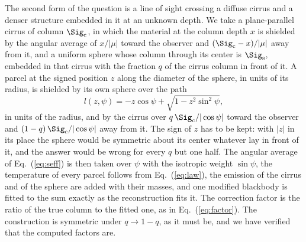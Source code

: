 The second form of the question is a line of sight crossing a diffuse cirrus and a denser structure embedded in it at an unknown
depth. We take a plane-parallel cirrus of column $\Sig_{\rm c}$, in which the material at the column depth $x$ is shielded by the
angular average of $x/|\mu|$ toward the observer and $(\Sig_{\rm c} - x)/|\mu|$ away from it, and a uniform sphere whose column
through its center is $\Sig_{\rm s}$, embedded in that cirrus with the fraction $q$ of the cirrus column in front of it. A parcel
at the signed position $z$ along the diameter of the sphere, in units of its radius, is shielded by its own sphere over the path
\begin{equation}
   l(z,\psi) = -z\cos\psi + \sqrt{1 - z^2\sin^2\psi} ,
\label{eq:lsphere}
\end{equation}
in units of the radius, and by the cirrus over $q\,\Sig_{\rm c}/|\cos\psi|$ toward the observer and
$(1-q)\,\Sig_{\rm c}/|\cos\psi|$ away from it. The sign of $z$ has to be kept: with $|z|$ in its place the sphere would be
symmetric about its center whatever lay in front of it, and the answer would be wrong for every $q$ but one half. The angular
average of Eq.~(\ref{eq:seff}) is then taken over $\psi$ with the isotropic weight $\sin\psi$, the temperature of every parcel
follows from Eq.~(\ref{eq:law}), the emission of the cirrus and of the sphere are added with their masses, and one modified
blackbody is fitted to the sum exactly as the reconstruction fits it. The correction factor is the ratio of the true column to the
fitted one, as in Eq.~(\ref{eq:factor}). The construction is symmetric under $q \rightarrow 1-q$, as it must be, and we have
verified that the computed factors are.

